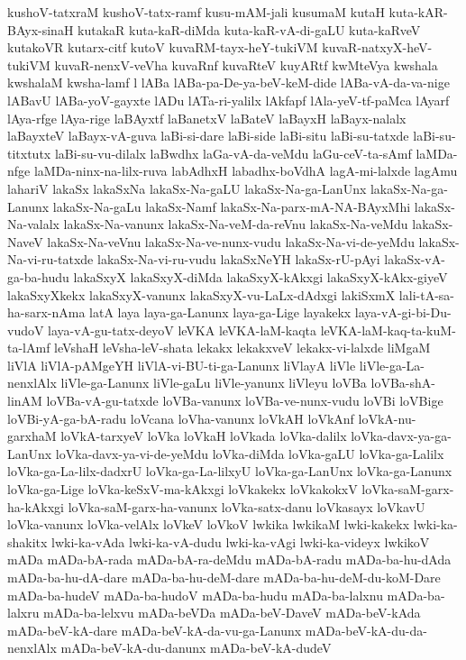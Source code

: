 {kushoV-tatxraM
kushoV-tatx-ramf
kusu-mAM-jali
kusumaM
kutaH
kuta-kAR-BAyx-sinaH
kutakaR
kuta-kaR-diMda
kuta-kaR-vA-di-gaLU
kuta-kaRveV
kutakoVR
kutarx-citf
kutoV
kuvaRM-tayx-heY-tukiVM
kuvaR-natxyX-heV-tukiVM
kuvaR-nenxV-veVha
kuvaRnf
kuvaRteV
kuyARtf
kwMteVya
kwshala
kwshalaM
kwsha-lamf
l
lABa
lABa-pa-De-ya-beV-keM-dide
lABa-vA-da-va-nige
lABavU
lABa-yoV-gayxte
lADu
lATa-ri-yalilx
lAkfapf
lAla-yeV-tf-paMca
lAyarf
lAya-rfge
lAya-rige
laBAyxtf
laBanetxV
laBateV
laBayxH
laBayx-nalalx
laBayxteV
laBayx-vA-guva
laBi-si-dare
laBi-side
laBi-situ
laBi-su-tatxde
laBi-su-titxtutx
laBi-su-vu-dilalx
laBwdhx
laGa-vA-da-veMdu
laGu-ceV-ta-sAmf
laMDa-nfge
laMDa-ninx-na-lilx-ruva
labAdhxH
labadhx-boVdhA
lagA-mi-lalxde
lagAmu
lahariV
lakaSx
lakaSxNa
lakaSx-Na-gaLU
lakaSx-Na-ga-LanUnx
lakaSx-Na-ga-Lanunx
lakaSx-Na-gaLu
lakaSx-Namf
lakaSx-Na-parx-mA-NA-BAyxMhi
lakaSx-Na-valalx
lakaSx-Na-vanunx
lakaSx-Na-veM-da-reVnu
lakaSx-Na-veMdu
lakaSx-NaveV
lakaSx-Na-veVnu
lakaSx-Na-ve-nunx-vudu
lakaSx-Na-vi-de-yeMdu
lakaSx-Na-vi-ru-tatxde
lakaSx-Na-vi-ru-vudu
lakaSxNeYH
lakaSx-rU-pAyi
lakaSx-vA-ga-ba-hudu
lakaSxyX
lakaSxyX-diMda
lakaSxyX-kAkxgi
lakaSxyX-kAkx-giyeV
lakaSxyXkekx
lakaSxyX-vanunx
lakaSxyX-vu-LaLx-dAdxgi
lakiSxmX
lali-tA-sa-ha-sarx-nAma
latA
laya
laya-ga-Lanunx
laya-ga-Lige
layakekx
laya-vA-gi-bi-Du-vudoV
laya-vA-gu-tatx-deyoV
leVKA
leVKA-laM-kaqta
leVKA-laM-kaq-ta-kuM-ta-lAmf
leVshaH
leVsha-leV-shata
lekakx
lekakxveV
lekakx-vi-lalxde
liMgaM
liVlA
liVlA-pAMgeYH
liVlA-vi-BU-ti-ga-Lanunx
liVlayA
liVle
liVle-ga-La-nenxlAlx
liVle-ga-Lanunx
liVle-gaLu
liVle-yanunx
liVleyu
loVBa
loVBa-shA-linAM
loVBa-vA-gu-tatxde
loVBa-vanunx
loVBa-ve-nunx-vudu
loVBi
loVBige
loVBi-yA-ga-bA-radu
loVcana
loVha-vanunx
loVkAH
loVkAnf
loVkA-nu-garxhaM
loVkA-tarxyeV
loVka
loVkaH
loVkada
loVka-dalilx
loVka-davx-ya-ga-LanUnx
loVka-davx-ya-vi-de-yeMdu
loVka-diMda
loVka-gaLU
loVka-ga-Lalilx
loVka-ga-La-lilx-dadxrU
loVka-ga-La-lilxyU
loVka-ga-LanUnx
loVka-ga-Lanunx
loVka-ga-Lige
loVka-keSxV-ma-kAkxgi
loVkakekx
loVkakokxV
loVka-saM-garx-ha-kAkxgi
loVka-saM-garx-ha-vanunx
loVka-satx-danu
loVkasayx
loVkavU
loVka-vanunx
loVka-velAlx
loVkeV
loVkoV
lwkika
lwkikaM
lwki-kakekx
lwki-ka-shakitx
lwki-ka-vAda
lwki-ka-vA-dudu
lwki-ka-vAgi
lwki-ka-videyx
lwkikoV
mADa
mADa-bA-rada
mADa-bA-ra-deMdu
mADa-bA-radu
mADa-ba-hu-dAda
mADa-ba-hu-dA-dare
mADa-ba-hu-deM-dare
mADa-ba-hu-deM-du-koM-Dare
mADa-ba-hudeV
mADa-ba-hudoV
mADa-ba-hudu
mADa-ba-lalxnu
mADa-ba-lalxru
mADa-ba-lelxvu
mADa-beVDa
mADa-beV-DaveV
mADa-beV-kAda
mADa-beV-kA-dare
mADa-beV-kA-da-vu-ga-Lanunx
mADa-beV-kA-du-da-nenxlAlx
mADa-beV-kA-du-danunx
mADa-beV-kA-dudeV
}
